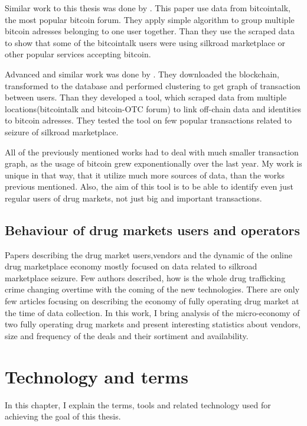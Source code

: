 \documentclass[
  digital, %
  table,   %
  lof,     %
  lot,     %
  oneside
]{fithesis3}
\begin{document}
Similar work to this thesis was done by \parencite{fleder2015bitcoin}. This paper use data from bitcointalk, the most popular bitcoin forum. 
They apply simple algorithm to group multiple bitcoin adresses belonging to one user together. Than they use the scraped data to show
that some of the bitcointalk users were using silkroad marketplace or other popular services accepting bitcoin.

Advanced and similar work was done by \parencite{spagnuolo2014bitiodine}. They downloaded the blockchain, transformed to the database
and performed clustering to get graph of transaction between users.
Than they developed a tool, which scraped data from multiple locations(bitcointalk and bitcoin-OTC forum) to link off-chain data and identities to bitcoin adresses.
They tested the tool on few popular transactions related to seizure of silkroad marketplace.

All of the previously mentioned works had to deal with much smaller transaction graph, as the usage of bitcoin grew exponentionally over the last year. 
My work is unique in that way, that it utilize much more sources of data, than the works previous mentioned. Also, the aim of this tool is to be able
to identify even just regular users of drug markets, not just big and important transactions.

\section{Behaviour of drug markets users and operators}

Papers describing the drug market users,vendors and the dynamic of
the online drug marketplace economy mostly focused on data related to silkroad marketplace seizure. 
Few authors described, how is the whole drug trafficking crime changing overtime with the coming of the new technologies.
There are only few articles focusing on describing the economy of fully operating drug market at the time of data collection.
In this work, I bring analysis of the micro-economy of two fully operating drug markets and present interesting statistics about vendors,
size and frequency of the deals and their sortiment and availability.

\chapter{Technology and terms}

In this chapter, I explain the terms, tools and related technology used for achieving the goal of this thesis.
\end{document}
